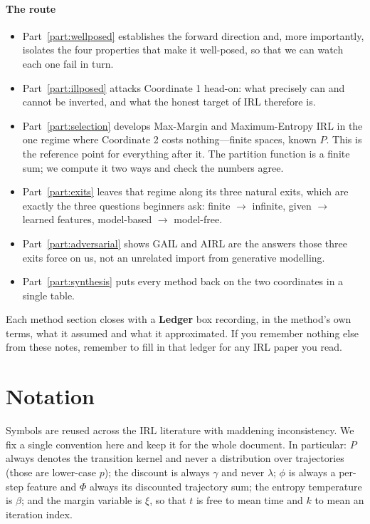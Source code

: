 \documentclass[11pt]{article}
\theoremstyle{plain}
\theoremstyle{definition}
\theoremstyle{remark}
\begin{document}
\paragraph{The route}
\begin{itemize}
  \item Part~\ref{part:wellposed} establishes the forward direction and,
  more importantly, isolates the four properties that make it well-posed,
  so that we can watch each one fail in turn.
  \item Part~\ref{part:illposed} attacks Coordinate 1 head-on: what
  precisely can and cannot be inverted, and what the honest target of IRL
  therefore is.
  \item Part~\ref{part:selection} develops Max-Margin and Maximum-Entropy
  IRL in the one regime where Coordinate 2 costs nothing---finite spaces,
  known $P$. This is the reference point for everything after it. The
  partition function is a finite sum; we compute it two ways and check the
  numbers agree.
  \item Part~\ref{part:exits} leaves that regime along its three natural
  exits, which are exactly the three questions beginners ask: finite
  $\to$ infinite, given $\to$ learned features, model-based $\to$
  model-free.
  \item Part~\ref{part:adversarial} shows GAIL and AIRL are the answers
  those three exits force on us, not an unrelated import from generative
  modelling.
  \item Part~\ref{part:synthesis} puts every method back on the two
  coordinates in a single table.
\end{itemize}

Each method section closes with a \textbf{Ledger} box recording, in the
method's own terms, what it assumed and what it approximated. If you
remember nothing else from these notes, remember to fill in that ledger
for any IRL paper you read.

\clearpage
\section*{Notation}

Symbols are reused across the IRL literature with maddening inconsistency.
We fix a single convention here and keep it for the whole document. In
particular: $P$ always denotes the transition kernel and never a
distribution over trajectories (those are lower-case $p$); the discount is
always $\gamma$ and never $\lambda$; $\phi$ is always a per-step feature and
$\Phi$ always its discounted trajectory sum; the entropy temperature is
$\beta$; and the margin variable is $\xi$, so that $t$ is free to mean time
and $k$ to mean an iteration index.
\end{document}
